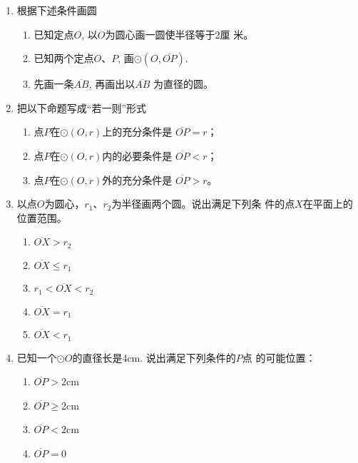 \begin{ex}
\begin{enumerate}
    \item 根据下述条件画圆
\begin{enumerate}
\item 已知定点$O$, 以$O$为圆心画一圆使半径等于2厘
米。
\item 已知两个定点$O$、$P$, 画$\odot(O,\overline{OP})$.
\item 先画一条$\overline{AB}$, 再画出以$\overline{AB}$
为直径的圆。
\end{enumerate}

\item 把以下命题写成“若一则”形式
\begin{enumerate}
\item 点$P$在$\odot(O,r)$上的充分条件是
$\overline{OP}=r$；
\item 点$P$在$\odot(O,r)$内的必要条件是
$\overline{OP}<r$；
\item 点$P$在$\odot(O,r)$外的充分条件是
$\overline{OP}>r$。
\end{enumerate}


\item 以点$O$为圆心，$r_1$、$r_2$为半径画两个圆。说出满足下列条
件的点$X$在平面上的位置范围。
\begin{multicols}{2}
\begin{enumerate}
    \item $\overline{OX} >r_2$
    \item $\overline{OX} \le r_1$
    \item $r_1<\overline{OX}<r_2 $
    \item $\overline{OX}=r_1 $
    \item $\overline{OX}<r_1 $
\end{enumerate}
\end{multicols}

\item 已知一个$\odot O$的直径长是4cm. 说出满足下列条件的$P$点
的可能位置：
\begin{multicols}{2}
    \begin{enumerate}
        \item $\overline{OP} >2$cm
        \item $\overline{OP} \ge 2$cm
        \item $\overline{OP} <2$cm
        \item $\overline{OP} =0$
    \end{enumerate}
    \end{multicols}


\end{enumerate}
\end{ex}
